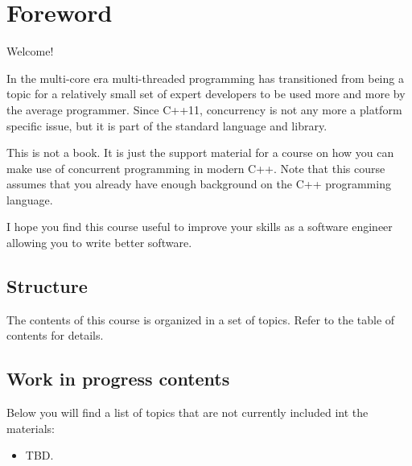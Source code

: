 \chapter*{Foreword}

Welcome!

In the multi-core era multi-threaded programming has transitioned
from being a topic for a relatively small set of expert developers
to be used more and more by the average programmer.
Since C++11, concurrency is not any more a platform specific issue,
but it is part of the standard language and library.

This is not a book. It is just the support material for a course on how you can
make use of concurrent programming in modern C++. 
Note that this course assumes that you
already have enough background on the C++ programming language.

I hope you find this course useful to improve your skills as a software
engineer allowing you to write better software.

\section*{Structure}

The contents of this course is organized in a set of topics. 
Refer to the table of contents for details.

\section*{Work in progress contents}

Below you will find a list of topics that are not currently included int the materials:

\begin{itemize}
  \item TBD.
\end{itemize}

